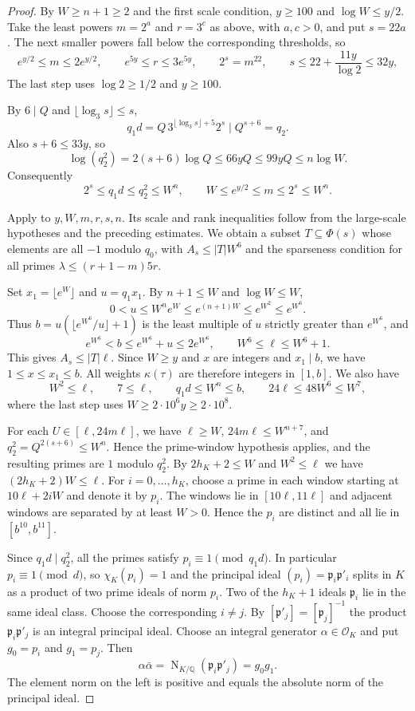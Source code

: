 \begin{proof}
By $W\ge n+1\ge2$ and the first scale condition, $y\ge100$ and $\log W\le y/2$. Take the least powers $m=2^a$ and $r=3^c$ as above, with $a,c>0$, and put $s=22a$. The next smaller powers fall below the corresponding thresholds, so
\[
 e^{y/2}\le m\le 2e^{y/2},\qquad
 e^{5y}\le r\le3e^{5y},\qquad
 2^s=m^{22},\qquad
 s\le22+\frac{11y}{\log 2}\le32y,
\]
The last step uses $\log 2\ge1/2$ and $y\ge100$.

By $6\mid Q$ and $\lfloor\log_3 s\rfloor\le s$,
\[
 q_1d=Q\,3^{\lfloor\log_3 s\rfloor+5}2^s\mid Q^{s+6}=q_2 .
\]
Also $s+6\le33y$, so
\[
 \log(q_2^2)=2(s+6)\log Q\le66yQ\le99yQ\le n\log W.
\]
Consequently
\[
 2^s\le q_1d\le q_2^2\le W^n,\qquad
 W\le e^{y/2}\le m\le2^s\le W^n.
\]

Apply  to $y,W,m,r,s,n$. Its scale and rank inequalities follow from the large-scale hypotheses and the preceding estimates. We obtain a subset $T\subseteq\Phi(s)$ whose elements are all $-1$ modulo $q_0$, with $A_s\le|T|W^6$ and the sparseness condition for all primes $\lambda\le(r+1-m)5r$.

Set $x_1=\lfloor e^W\rfloor$ and $u=q_1x_1$. By $n+1\le W$ and $\log W\le W$,
\[
 0<u\le W^n e^W\le e^{(n+1)W}\le e^{W^2}\le e^{W^6}.
\]
Thus $b=u(\lfloor e^{W^6}/u\rfloor+1)$ is the least multiple of $u$ strictly greater than $e^{W^6}$, and
\[
 e^{W^6}<b\le e^{W^6}+u\le2e^{W^6},\qquad
 W^6\le \ell\le W^6+1 .
\]
This gives $A_s\le |T|\ell$. Since $W\ge y$ and $x$ are integers and $x_1\mid b$, we have $1\le x\le x_1\le b$. All weights $\kappa(\tau)$ are therefore integers in $[1,b]$. We also have
\[
 W^2\le \ell,\qquad 7\le \ell,\qquad q_1d\le W^n\le b,\qquad
 24\ell\le48W^6\le W^7 ,
\]
where the last step uses $W\ge2\cdot10^6y\ge2\cdot10^8$.

For each $U\in[\ell,24m\ell]$, we have $\ell\ge W$, $24m\ell\le W^{n+7}$, and $q_2^2=Q^{2(s+6)}\le W^n$. Hence the prime-window hypothesis applies, and the resulting primes are $1$ modulo $q_2^2$. By $2h_K+2\le W$ and $W^2\le \ell$ we have $(2h_K+2)W\le \ell$. For $i=0,\ldots,h_K$, choose a prime in each window starting at
$10\ell+2iW$ and denote it by $p_i$. The windows lie in $[10\ell,11\ell]$ and adjacent windows are separated by at least $W>0$. Hence the $p_i$ are distinct and all lie in $[b^{10},b^{11}]$.

Since $q_1d\mid q_2^2$, all the primes satisfy $p_i\equiv1\pmod{q_1d}$. In particular $p_i\equiv1\pmod d$, so $\chi_K(p_i)=1$ and the principal ideal
$(p_i)=\mathfrak p_i\mathfrak p'_i$ splits in $K$ as a product of two prime ideals of norm $p_i$. Two of the $h_K+1$ ideals $\mathfrak p_i$ lie in the same ideal class. Choose the corresponding $i\ne j$. By $[\mathfrak p'_j]=[\mathfrak p_j]^{-1}$ the product $\mathfrak p_i\mathfrak p'_j$ is an integral principal ideal. Choose an integral generator $\alpha\in\mathcal O_K$ and put $g_0=p_i$ and $g_1=p_j$. Then
\[
 \alpha\bar\alpha
 =\operatorname{N}_{K/\mathbb Q}(\mathfrak p_i\mathfrak p'_j)
 =g_0g_1.
\]
The element norm on the left is positive and equals the absolute norm of the principal ideal.


\end{proof}
